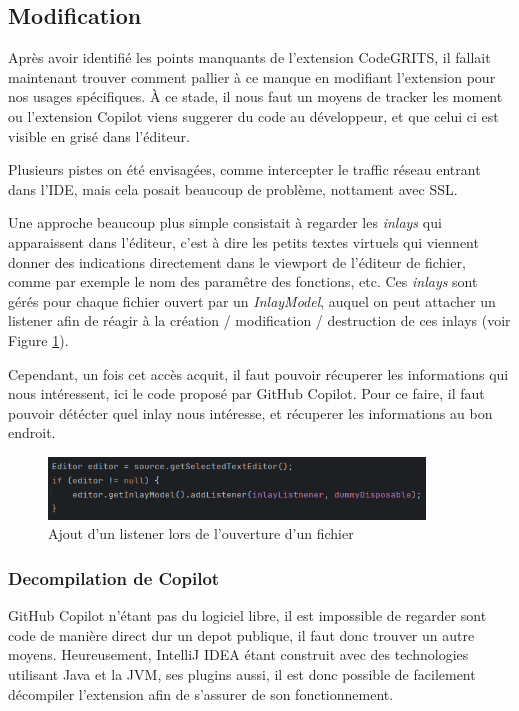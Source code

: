 \subsection{Modification}

Après avoir identifié les points manquants de l'extension CodeGRITS, il fallait maintenant trouver comment pallier à ce manque
en modifiant l'extension pour nos usages spécifiques.
À ce stade, il nous faut un moyens de tracker les moment ou l'extension Copilot viens suggerer du code au développeur, et que celui ci est visible
en grisé dans l'éditeur.

Plusieurs pistes on été envisagées, comme intercepter le traffic réseau entrant dans l'IDE, mais cela posait beaucoup de problème, nottament avec SSL.

Une approche beaucoup plus simple consistait à regarder les \emph{inlays} qui apparaissent dans l'éditeur,
c'est à dire les petits textes virtuels qui viennent donner des indications directement dans le viewport de l'éditeur de fichier,
comme par exemple le nom des paramêtre des fonctions, etc.
Ces \emph{inlays} sont gérés pour chaque fichier ouvert par un \emph{InlayModel}, auquel on peut attacher un listener afin de réagir
à la création / modification / destruction de ces inlays (voir Figure \ref{inlay-listener}).

Cependant, un fois cet accès acquit, il faut pouvoir récuperer les informations qui nous intéressent, ici le code proposé par GitHub Copilot.
Pour ce faire, il faut pouvoir détécter quel inlay nous intéresse, et récuperer les informations au bon endroit.

\begin{figure}
	\centering
	\includegraphics[width=10cm]{images/inlay-listener.png}
	\caption{Ajout d'un listener lors de l'ouverture d'un fichier}
	\label{inlay-listener}
\end{figure}


\subsubsection{Decompilation de Copilot}

GitHub Copilot n'étant pas du logiciel libre, il est impossible de regarder sont code de manière direct dur un depot publique, il faut donc trouver un autre moyens.
Heureusement, IntelliJ IDEA étant construit avec des technologies utilisant Java et la JVM, ses plugins aussi, il est donc possible de facilement décompiler l'extension afin de s'assurer de son fonctionnement.

